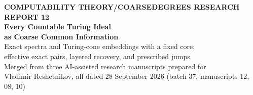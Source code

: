 \documentclass[11pt,letterpaper]{article}
\theoremstyle{plain}
\theoremstyle{definition}
\theoremstyle{remark}
\numberwithin{equation}{section}
\begin{document}
\thispagestyle{plain}
\begin{center}
{\sffamily\small\bfseries\color{Steel}COMPUTABILITY THEORY\quad /\quad COARSEDEGREES RESEARCH REPORT 12}\\[13pt]
{\fontsize{24}{29}\selectfont\bfseries\color{Navy}Every Countable Turing Ideal\\as Coarse Common Information}\\[10pt]
{\large Exact spectra and Turing-cone embeddings with a fixed core;\\
effective exact pairs, layered recovery, and prescribed jumps}\\[12pt]
{\color{Muted}Merged from three AI-assisted research manuscripts prepared for\\
Vladimir Reshetnikov, all dated 28 September 2026 (batch 37, manuscripts 12, 08, 10)}
\end{center}
\vspace{6pt}
\end{document}

